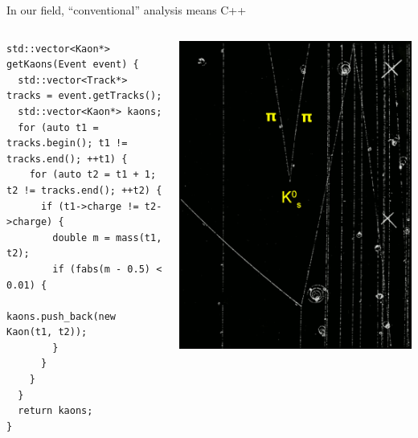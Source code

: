 \documentclass[aspectratio=169]{beamer}
\begin{document}
\begin{frame}[fragile]{In our field, ``conventional'' analysis means C++}
\vspace{0.25 cm}
\begin{columns}[b]
\begin{verbatim}
std::vector<Kaon*> getKaons(Event event) {
  std::vector<Track*> tracks = event.getTracks();
  std::vector<Kaon*> kaons;
  for (auto t1 = tracks.begin(); t1 != tracks.end(); ++t1) {
    for (auto t2 = t1 + 1; t2 != tracks.end(); ++t2) {
      if (t1->charge != t2->charge) {
        double m = mass(t1, t2);
        if (fabs(m - 0.5) < 0.01) {
          kaons.push_back(new Kaon(t1, t2));
        }
      }
    }
  }
  return kaons;
}
\end{verbatim}

\vspace{0.1 cm}

\includegraphics[width=\linewidth]{kshort-1.png}
\end{columns}
\end{frame}
\end{document}
